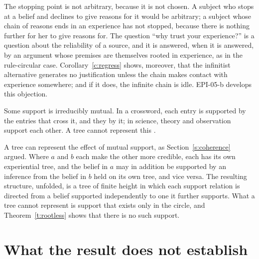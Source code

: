 \documentclass{situationist-preprint}
\begin{document}
\begin{reply}
The stopping point is not arbitrary, because it is not chosen. A subject who stops at a belief and declines to give reasons for it would be arbitrary; a subject whose chain of reasons ends in an experience has not stopped, because there is nothing further for her to give reasons for. The question \enquote{why trust your experience?} is a question about the reliability of a source, and it is answered, when it is answered, by an argument whose premises are themselves rooted in experience, as in the rule-circular case. Corollary~\ref{c:regress} shows, moreover, that the infinitist alternative generates no justification unless the chain makes contact with experience somewhere; and if it does, the infinite chain is idle. EPI-05-b develops this objection.
\end{reply}

\begin{objection}
Some support is irreducibly mutual. In a crossword, each entry is supported by the entries that cross it, and they by it; in science, theory and observation support each other. A tree cannot represent this \citep{Haack1993}.
\end{objection}

\begin{reply}
A tree can represent the effect of mutual support, as Section~\ref{s:coherence} argued. Where $a$ and $b$ each make the other more credible, each has its own experiential tree, and the belief in $a$ may in addition be supported by an inference from the belief in $b$ held on its own tree, and vice versa. The resulting structure, unfolded, is a tree of finite height in which each support relation is directed from a belief supported independently to one it further supports. What a tree cannot represent is support that exists only in the circle, and Theorem~\ref{t:rootless} shows that there is no such support.
\end{reply}

\section{What the result does not establish}\label{s:limits}
\end{document}
